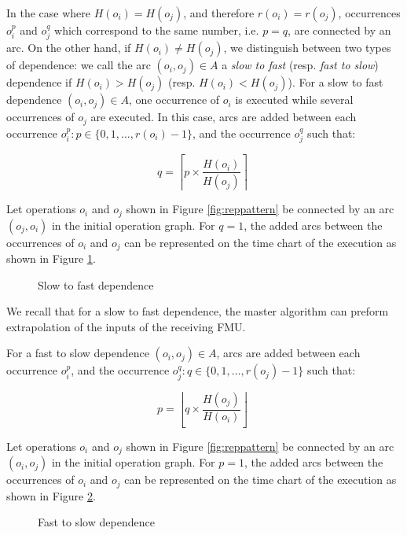 In the case where $H(o_i) = H(o_j)$, and therefore $r(o_i) = r(o_j)$, occurrences $o_i^p$ and $o_j^q$ which correspond to the same number, i.e. $p = q$, are connected by an arc. On the other hand, if $H(o_i) \neq H(o_j)$, we distinguish between two types of dependence: we call the arc $(o_i,o_j) \in A$ a \textit{slow to fast} (resp. \textit{fast to slow}) dependence if $H(o_i) > H(o_j)$ (resp. $H(o_i) < H(o_j)$). For a slow to fast dependence $(o_i,o_j) \in A$, one occurrence of $o_i$ is executed while several occurrences of $o_j$ are executed. In this case, arcs are added between each occurrence $o_i^p: p \in \{0,1, \dots ,r(o_i)-1\}$, and the occurrence $o_j^q$ such that:

\begin{equation}
q = \left \lceil{p \times \frac{H(o_i)}{H(o_j)}}\right \rceil\;
\end{equation}

Let operations $o_i$ and $o_j$ shown in Figure \ref{fig:reppattern} be connected by an arc $(o_j,o_i)$ in the initial operation graph. For $q = 1$, the added arcs between the occurrences of $o_i$ and $o_j$ can be represented on the time chart of the execution as shown in Figure \ref{fig:slow2fast}.

\begin{figure}[htb]
\centering
  
\caption{Slow to fast dependence}
\label{fig:slow2fast}
\end{figure} 


We recall that for a slow to fast dependence, the master algorithm can preform extrapolation of the inputs of the receiving FMU. 

For a fast to slow dependence $(o_i,o_j) \in A$, arcs are added between each occurrence $o_i^p$, and the occurrence $o_j^q: q \in \{0,1, \dots ,r(o_j)-1\}$ such that:

\begin{equation}
p = \left \lfloor{q \times \frac{H(o_j)}{H(o_i)}}\right \rfloor\;
\end{equation}

Let operations $o_i$ and $o_j$ shown in Figure \ref{fig:reppattern} be connected by an arc $(o_i,o_j)$ in the initial operation graph. For $p = 1$, the added arcs between the occurrences of $o_i$ and $o_j$ can be represented on the time chart of the execution as shown in Figure \ref{fig:fast2slow}.

\begin{figure}[htb]
\centering
  
\caption{Fast to slow dependence}
\label{fig:fast2slow}
\end{figure}

